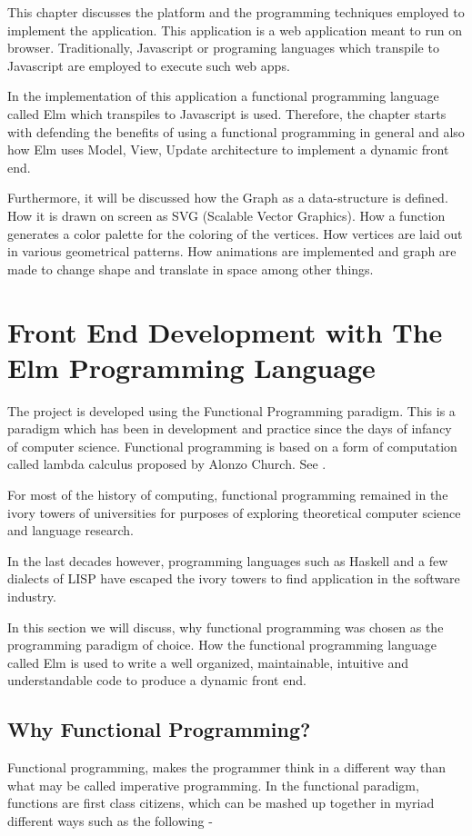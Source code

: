 \graphicspath{ {images/} }

This chapter discusses the platform and the programming techniques employed to
implement the application.  This application is a web application meant to run
on browser. Traditionally, Javascript or programing languages which transpile
to Javascript are employed to execute such web apps. 

In the implementation of this application a functional programming language
called Elm which transpiles to Javascript is used. Therefore, the chapter
starts with defending the benefits of using a functional programming in general
and also how Elm uses Model, View, Update architecture to implement a dynamic
front end.

Furthermore, it will be discussed how the Graph as a data-structure is defined.
How it is drawn on screen as SVG (Scalable Vector Graphics). How a function
generates a color palette for the coloring of the vertices. How vertices are
laid out in various geometrical patterns. How animations are implemented and
graph are made to change shape and translate in space among other things.


\section{Front End Development with The Elm Programming Language}

The project is developed using the Functional Programming paradigm. This is a
paradigm which has been in development and practice since the days of infancy
of computer science. Functional programming is based on a form of computation
called lambda calculus proposed by Alonzo Church. See \cite{Hudak2007}.

For most of the history of computing, functional programming remained in the
ivory towers of universities for purposes of exploring theoretical computer
science and language research.

In the last decades however, programming languages such as Haskell and a few
dialects of LISP have escaped the ivory towers to find application in the
software industry.

In this section we will discuss, why functional programming was chosen as the
programming paradigm of choice. How the functional programming language called
Elm is used to write a well organized, maintainable, intuitive and
understandable code to produce a dynamic front end.

\subsection{Why Functional Programming?}
Functional programming, makes the programmer think in a different way than what
may be called imperative programming. In the functional paradigm, functions are
first class citizens, which can be mashed up together in myriad different ways
such as the following -


